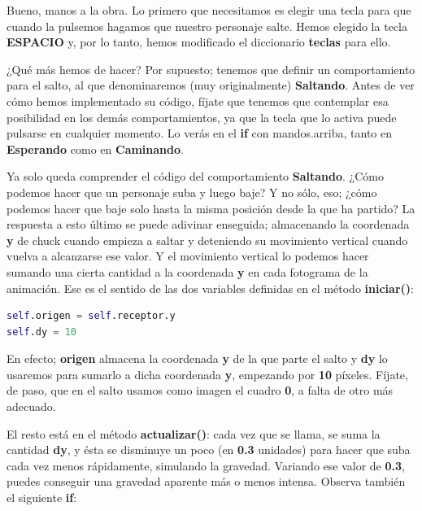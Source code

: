 \documentclass{article}
\begin{document}
Bueno, manos a la obra. Lo primero que necesitamos es elegir una tecla para que cuando la pulsemos hagamos que nuestro personaje salte. Hemos elegido la tecla \textbf{ESPACIO} y, por lo tanto, hemos modificado el diccionario \textbf{teclas} para ello.\par
¿Qué más hemos de hacer? Por supuesto; tenemos que definir un comportamiento para el salto, al que denominaremos (muy originalmente) \textbf{Saltando}. Antes de ver cómo hemos implementado su código, fíjate que tenemos que contemplar esa posibilidad en los demás comportamientos, ya que la tecla que lo activa puede pulsarse en cualquier momento. Lo verás en el \textcolor{codepurple}{\textbf{if}} con mandos.arriba, tanto en \textbf{Esperando} como en \textbf{Caminando}.\par
Ya solo queda comprender el código del comportamiento \textbf{Saltando}. ¿Cómo podemos hacer que un personaje suba y luego baje? Y no sólo, eso; ¿cómo podemos hacer que baje solo hasta la misma posición desde la que ha partido? La respuesta a esto último se puede adivinar enseguida; almacenando la coordenada \textbf{y} de chuck cuando empieza a saltar y deteniendo su movimiento vertical cuando vuelva a alcanzarse ese valor. Y el movimiento vertical lo podemos hacer sumando una cierta cantidad a la coordenada \textbf{y} en cada fotograma de la animación. Ese es el sentido de las dos variables definidas en el método \textbf{iniciar()}:\par

\begin{lstlisting}[language=Python]
self.origen = self.receptor.y
self.dy = 10
\end{lstlisting}
\vspace{\baselineskip}

En efecto; \textbf{origen} almacena la coordenada \textbf{y} de la que parte el salto y \textbf{dy} lo usaremos para sumarlo a dicha coordenada \textbf{y}, empezando por \textbf{10} píxeles. Fíjate, de paso, que en el salto usamos como imagen el cuadro \textbf{0}, a falta de otro más adecuado.\par

El resto está en el método \textbf{actualizar()}: cada vez que se llama, se suma la cantidad \textbf{dy}, y ésta se disminuye un poco (en \textbf{0.3} unidades) para hacer que suba cada vez menos rápidamente, simulando la gravedad. Variando ese valor de \textbf{0.3}, puedes conseguir una gravedad aparente más o menos intensa. Observa también el siguiente \textcolor{codepurple}{\textbf{if}}:
\end{document}
